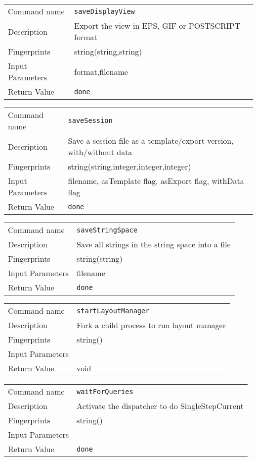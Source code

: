 \noindent
\begin{tabular}{l|p{5in}}
\hline
Command name &{\tt saveDisplayView }\\ 
Description &
Export the view in EPS, GIF or POSTSCRIPT format
 	\\
Fingerprints & string(string,string)\\
Input Parameters&format,filename \\
Return Value&{\tt done}\\
\hline
\end{tabular}
\bigskip

\noindent
\begin{tabular}{l|p{5in}}
\hline
Command name &{\tt saveSession }\\ 
Description &
Save a session file as a template/export version, with/without data
 	\\
Fingerprints & string(string,integer,integer,integer)\\
Input Parameters&filename, asTemplate flag, asExport flag, withData flag\\
Return Value&{\tt done}\\
\hline
\end{tabular}
\bigskip

\noindent
\begin{tabular}{l|p{5in}}
\hline
Command name &{\tt saveStringSpace }\\ 
Description &
Save all strings in the string space into a file
 	\\
Fingerprints & string(string)\\
Input Parameters&filename\\
Return Value&{\tt done}\\
\hline
\end{tabular}
\bigskip

\noindent
\begin{tabular}{l|p{5in}}
\hline
Command name &{\tt startLayoutManager }\\ 
Description &
Fork a child process to run layout manager
 	\\
Fingerprints & string()\\
Input Parameters&\\
Return Value&void\\
\hline
\end{tabular}
\bigskip

\noindent
\begin{tabular}{l|p{5in}}
\hline
Command name &{\tt waitForQueries }\\ 
Description &
Activate the dispatcher to do SingleStepCurrent
 	\\
Fingerprints & string()\\
Input Parameters&\\
Return Value&{\tt done}\\
\hline
\end{tabular}
\bigskip

